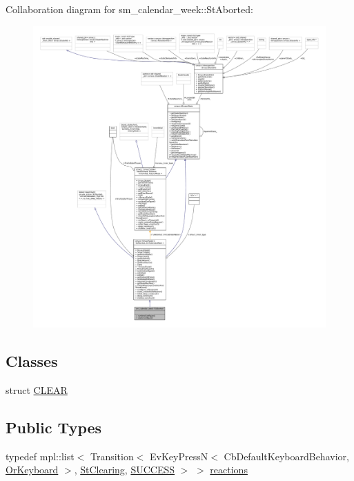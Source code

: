 Collaboration diagram for sm\+\_\+calendar\+\_\+week\+:\+:St\+Aborted\+:
\nopagebreak
\begin{figure}[H]
\begin{center}
\leavevmode
\includegraphics[width=350pt]{structsm__calendar__week_1_1StAborted__coll__graph}
\end{center}
\end{figure}
\subsection*{Classes}
\begin{DoxyCompactItemize}
\item 
struct \hyperlink{structsm__calendar__week_1_1StAborted_1_1CLEAR}{C\+L\+E\+AR}
\end{DoxyCompactItemize}
\subsection*{Public Types}
\begin{DoxyCompactItemize}
\item 
typedef mpl\+::list$<$ Transition$<$ Ev\+Key\+PressN$<$ Cb\+Default\+Keyboard\+Behavior, \hyperlink{classsm__calendar__week_1_1OrKeyboard}{Or\+Keyboard} $>$, \hyperlink{structsm__calendar__week_1_1StClearing}{St\+Clearing}, \hyperlink{classSUCCESS}{S\+U\+C\+C\+E\+SS} $>$ $>$ \hyperlink{structsm__calendar__week_1_1StAborted_a1f62d88bac0c3cf13a01736029bf4b62}{reactions}
\end{DoxyCompactItemize}
